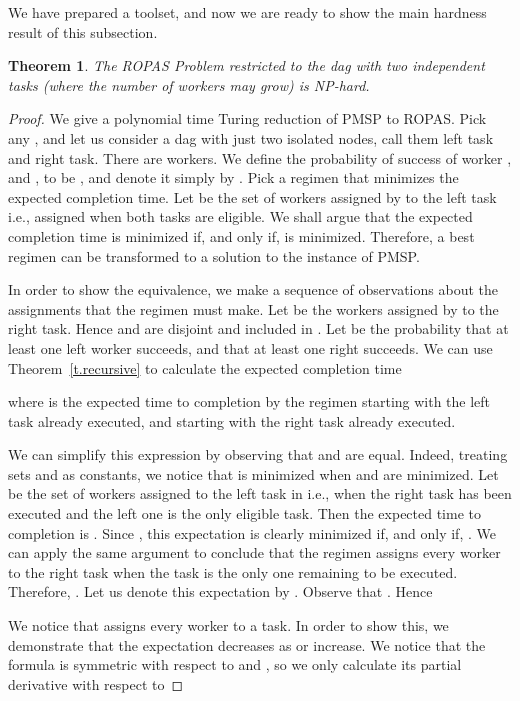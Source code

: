 \documentclass[letterpaper,11pt]{article}
\newtheorem{theorem}{Theorem}[section]
\begin{document}
We have prepared a toolset, and now we are ready to show the main hardness result of this subsection.

\begin{theorem}
The ROPAS Problem restricted to the dag with two independent tasks (where the number of workers may grow) is NP-hard.
\end{theorem}

\begin{proof}
We give a polynomial time Turing reduction of PMSP to ROPAS. Pick any , and let us consider a dag with just two isolated nodes, call them left task and right task. There are  workers. We define the probability of success of worker ,  and , to be , and denote it simply by . Pick a regimen  that minimizes the expected completion time. Let  be the set of workers assigned by  to the left task i.e., assigned when both tasks are eligible. We shall argue that the expected completion time is minimized if, and only if,  is minimized. Therefore, a best regimen can be transformed to a solution to the instance of PMSP.

In order to show the equivalence, we make a sequence of observations about the assignments that the regimen must make. Let  be the workers assigned by  to the right task. Hence  and  are disjoint and included in . Let  be the probability that at least one left worker succeeds, and  that at least one right succeeds. We can use Theorem~\ref{t.recursive} to calculate the expected completion time  

where  is the expected time to completion by the regimen starting with the left task already executed, and  starting with the right task already executed. 

We can simplify this expression by observing that  and  are equal. Indeed, treating sets  and  as constants, we notice that  is minimized when  and  are minimized. Let  be the set of workers assigned to the left task in  i.e., when the right task has been executed and the left one is the only eligible task. Then the expected time to completion   is . Since , this expectation is clearly minimized if, and only if, . We can apply the same argument to conclude that the regimen assigns every worker to the right task when the task is the only one remaining to be executed. Therefore, . Let us denote this expectation by . Observe that . Hence 


We notice that  assigns every worker to a task.
 In order to show this, we demonstrate that the expectation decreases as  or  increase. We notice that the formula is symmetric with respect to  and , so we only calculate its partial derivative with respect to 


\end{proof}
\end{document}
